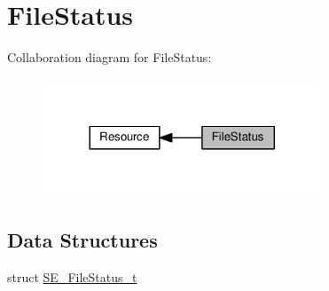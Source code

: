\hypertarget{group__FileStatus}{}\section{File\+Status}
\label{group__FileStatus}
Collaboration diagram for File\+Status\+:\nopagebreak
\begin{figure}[H]
\begin{center}
\leavevmode
\includegraphics[width=236pt]{group__FileStatus}
\end{center}
\end{figure}
\subsection*{Data Structures}
\begin{DoxyCompactItemize}
\item 
struct \hyperlink{structSE__FileStatus__t}{S\+E\+\_\+\+File\+Status\+\_\+t}
\end{DoxyCompactItemize}
